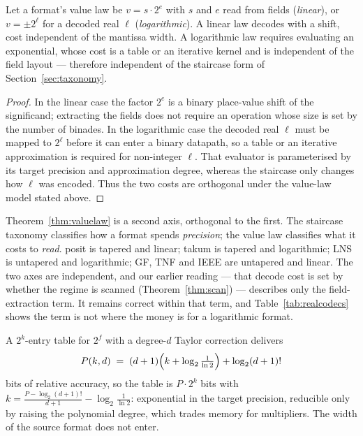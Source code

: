 \begin{theorem}
\label{thm:valuelaw}
Let a format's value law be $v = s \cdot 2^{e}$ with $s$ and $e$ read from fields
(\emph{linear}), or $v = \pm 2^{\ell}$ for a decoded real $\ell$
(\emph{logarithmic}). A linear law decodes with a shift, cost independent of the
mantissa width. A logarithmic law requires evaluating an exponential, whose cost
is a table or an iterative kernel and is independent of the field layout ---
therefore independent of the staircase form of Section~\ref{sec:taxonomy}.
\end{theorem}
\begin{proof}
In the linear case the factor $2^e$ is a binary place-value shift of the
significand; extracting the fields does not require an operation whose size is
set by the number of binades.  In the logarithmic case the decoded real
$\ell$ must be mapped to $2^\ell$ before it can enter a binary datapath, so a
table or an iterative approximation is required for non-integer $\ell$.
That evaluator is parameterised by its target precision and approximation
degree, whereas the staircase only changes how $\ell$ was encoded.  Thus the
two costs are orthogonal under the value-law model stated above.
\end{proof}

Theorem~\ref{thm:valuelaw} is a second axis, orthogonal to the first. The
staircase taxonomy classifies how a format spends \emph{precision}; the value law
classifies what it costs to \emph{read}. posit is tapered and linear; takum is
tapered and logarithmic; LNS is untapered and logarithmic; GF, TNF and IEEE are
untapered and linear. The two axes are independent, and our earlier reading ---
that decode cost is set by whether the regime is scanned
(Theorem~\ref{thm:scan}) --- describes only the field-extraction term. It remains
correct within that term, and Table~\ref{tab:realcodecs} shows the term is not
where the money is for a logarithmic format.


\begin{theorem}
\label{thm:targetprec}
A $2^{k}$-entry table for $2^{f}$ with a degree-$d$ Taylor correction delivers
\[
P(k,d) \;=\; (d+1)\Bigl(k + \log_2\tfrac{1}{\ln 2}\Bigr) + \log_2 (d+1)!
\]
bits of relative accuracy, so the table is $P \cdot 2^{k}$ bits with
$k = \frac{P - \log_2 (d+1)!}{d+1} - \log_2\frac{1}{\ln 2}$: exponential in the
target precision, reducible only by raising the polynomial degree, which trades
memory for multipliers. The width of the source format does not enter.
\end{theorem}

